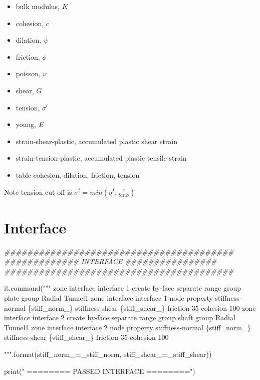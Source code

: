 \documentclass[a4paper, nobind]{templates/ociamthesis}
\providecommand{\tightlist}{%
  \setlength{\itemsep}{0pt}\setlength{\parskip}{0pt}}
\newenvironment{Shaded}{\begin{snugshade}}{\end{snugshade}}
\newcommand{\BuiltInTok}[1]{#1}
\newcommand{\CommentTok}[1]{\textcolor[rgb]{0.56,0.35,0.01}{\textit{#1}}}
\newcommand{\NormalTok}[1]{#1}
\newcommand{\OperatorTok}[1]{\textcolor[rgb]{0.81,0.36,0.00}{\textbf{#1}}}
\newcommand{\SpecialCharTok}[1]{\textcolor[rgb]{0.00,0.00,0.00}{#1}}
\newcommand{\StringTok}[1]{\textcolor[rgb]{0.31,0.60,0.02}{#1}}
\renewenvironment{Shaded}
{
  \vspace{10pt}%
  \begin{snugshade}%
}{%
  \end{snugshade}%
  \vspace{8pt}%
}
\begin{document}
\begin{itemize}
\tightlist
\item
  bulk modulus, \(K\)
\item
  cohesion, \(c\)
\item
  dilation, \(\psi\)
\item
  friction, \(\phi\)
\item
  poisson, \(\nu\)
\item
  shear, \(G\)
\item
  tension, \(\sigma^{t}\)
\item
  young, \(E\)
\item
  strain-shear-plastic, accumulated plastic shear strain
\item
  strain-tension-plastic, accumulated plastic tensile strain
\item
  table-cohesion, dilation, friction, tension
\end{itemize}

Note tension cut-off is \(\sigma^{t} = min(\sigma^{t}, \frac{c}{tan\phi})\)

\hypertarget{interface}{%
\section{Interface}\label{interface}}

\begin{Shaded}
\begin{Highlighting}[]
\CommentTok{\#\#\#\#\#\#\#\#\#\#\#\#\#\#\#\#\#\#\#\#\#\#\#\#\#\#\#\#\#\#\#\#\#\#\#\#\#\#\#\#}
\CommentTok{\#\#\#\#\#\#\#\#\#\#\#\#\# INTERFACE \#\#\#\#\#\#\#\#\#\#\#\#\#\#\#\#}
\CommentTok{\#\#\#\#\#\#\#\#\#\#\#\#\#\#\#\#\#\#\#\#\#\#\#\#\#\#\#\#\#\#\#\#\#\#\#\#\#\#\#\#}

\NormalTok{it.command(}\StringTok{"""}
\StringTok{zone interface \textquotesingle{}interface 1\textquotesingle{} create by{-}face separate range group \textquotesingle{}plate\textquotesingle{} group \textquotesingle{}Radial Tunnel1\textquotesingle{}}
\StringTok{zone interface \textquotesingle{}interface 1\textquotesingle{} node property stiffness{-}normal }\SpecialCharTok{\{stiff\_norm\_\}}\StringTok{ stiffness{-}shear }\SpecialCharTok{\{stiff\_shear\_\}}\StringTok{ friction 35 cohesion 100}
\StringTok{zone interface \textquotesingle{}interface 2\textquotesingle{} create by{-}face separate range group \textquotesingle{}shaft\textquotesingle{} group \textquotesingle{}Radial Tunnel1\textquotesingle{}}
\StringTok{zone interface \textquotesingle{}interface 2\textquotesingle{} node property stiffness{-}normal }\SpecialCharTok{\{stiff\_norm\_\}}\StringTok{ stiffness{-}shear }\SpecialCharTok{\{stiff\_shear\_\}}\StringTok{ friction 35 cohesion 100}

\StringTok{"""}\NormalTok{.}\BuiltInTok{format}\NormalTok{(stiff\_norm\_}\OperatorTok{=}\NormalTok{\_stiff\_norm, stiff\_shear\_}\OperatorTok{=}\NormalTok{\_stiff\_shear))}

\BuiltInTok{print}\NormalTok{(}\StringTok{"               ======== PASSED INTERFACE ========"}\NormalTok{)}
\end{Highlighting}
\end{Shaded}
\end{document}
